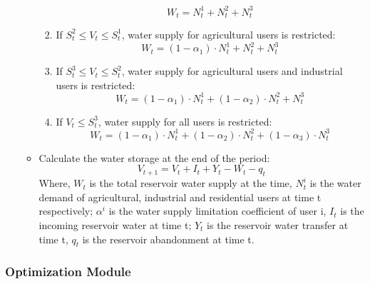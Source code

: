 \begin{enumerate}[(1)]
\begin{itemize}
\begin{enumerate}
            \begin{equation}
            W_{t}=N^{1}_{t}+N^{2}_{t}+N^{3}_{t}
            \end{equation}
          \item If $S^{2}_{t}\leq V_{t} \leq S^{1}_{t}$, water supply for agricultural users is restricted:
            \begin{equation}
              W_{t}=(1-\alpha_{1})\cdot N^{1}_{t}+N^{2}_{t}+N^{3}_{t}
            \end{equation}
          \item If $S^{3}_{t}\leq V_{t}\leq S^{2}_{t}$, water supply for agricultural users and industrial users is restricted:
            \begin{equation}
              W_t=(1-\alpha_1)\cdot N^1_t+(1-\alpha_2)\cdot N^2_t+N^3_t
            \end{equation}
          \item If $V_t\leq S^3_t$, water supply for all users is restricted:
            \begin{equation}
              W_t=(1-\alpha_1)\cdot N^1_t+(1-\alpha_2)\cdot N^2_t+(1-\alpha_3)\cdot N^3_t
            \end{equation}
       \end{enumerate}
      \item Calculate the water storage at the end of the period:
        \begin{equation}
          V_{t+1}=V_t+I_t+Y_t-W_t-q_t
        \end{equation}
        Where, $W_t$ is the total reservoir water supply at the time, $N^i_t$ is the water demand of agricultural, industrial and residential users at time t respectively; $\alpha^i$ is the water supply limitation coefficient of user i, $I_t$ is the incoming reservoir water at time t; $Y_t$ is the reservoir water transfer at time t, $q_t$ is the reservoir abandonment at time t.
    \end{itemize}
\end{enumerate}
\subsubsection{Optimization Module}
